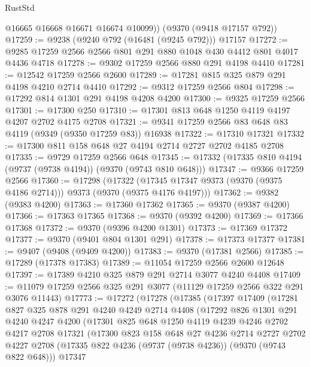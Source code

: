 \begin{lexlean}{RustStd}
\begin{coremodule}
        @16665
        @16668
        @16671
        @16674
        @10099))
    (@9370 (@9418 @17157 @792))
@17259 := @9238 (@9240 @792 (@16481 (@9245 @792))) @17157
@17272 := @9285 @17259 @2566 @2566 @801 @291 @880 @1048 @430 @4412 @801 @4017 @4436 @4718
@17278 := @9302 @17259 @2566 @880 @291 @4198 @4410
@17281 := @12542 @17259 @2566 @2600
@17289 := @17281 @815 @325 @879 @291 @4198 @4210 @2714 @4410
@17292 := @9312 @17259 @2566 @804
@17298 := @17292 @814 @1301 @291 @4198 @4208 @4200
@17300 := @9325 @17259 @2566
@17301 := @17300 @250
@17310 := @17301 @813 @648 @1250 @4119 @4197 @4207 @2702 @4175 @2708
@17321 := @9341 @17259 @2566 @83 @648 @83 @4119 (@9349 (@9350 @17259 @83)) @16938
@17322 := @17310 @17321
@17332 := @17300 @811 @158 @648 @27 @4194 @2714 @2727 @2702 @4185 @2708
@17335 := @9729 @17259 @2566 @648
@17345 := @17332 (@17335 @810 @4194 (@9737 (@9738 @4194)) (@9370 (@9743 @810 @648)))
@17347 := @9366 @17259 @2566
@17360 := @17298
    (@17322 (@17345 @17347 @9373 (@9370 (@9375 @4186 @2714))) @9373 (@9370 (@9375 @4176 @4197)))
@17362 := @9382 (@9383 @4200)
@17363 := @17360 @17362
@17365 := @9370 (@9387 @4200)
@17366 := @17363 @17365
@17368 := @9370 (@9392 @4200)
@17369 := @17366 @17368
@17372 := @9370 (@9396 @4200 @1301)
@17373 := @17369 @17372
@17377 := @9370 (@9401 @804 @1301 @291)
@17378 := @17373 @17377
@17381 := @9407 (@9408 (@9409 @4200))
@17383 := @9370 (@17381 @2566)
@17385 := @17289 (@17378 @17383)
@17389 := @11054 @17259 @2566 @2600 @12648
@17397 := @17389 @4210 @325 @879 @291 @2714 @3077 @4240 @4408
@17409 := @11079 @17259 @2566 @325 @291 @3077 (@11129 @17259 @2566 @322 @291 @3076 @11443)
@17773 := @17272
    (@17278
      (@17385
        (@17397
          @17409
          (@17281
            @827
            @325
            @878
            @291
            @4240
            @4249
            @2714
            @4408
            (@17292
              @826
              @1301
              @291
              @4240
              @4247
              @4200
              (@17301
                @825
                @648
                @1250
                @4119
                @4239
                @4246
                @2702
                @4217
                @2708
                @17321
                (@17300
                  @823
                  @158
                  @648
                  @27
                  @4236
                  @2714
                  @2727
                  @2702
                  @4227
                  @2708
                  (@17335 @822 @4236 (@9737 (@9738 @4236)) (@9370 (@9743 @822 @648)))
                  @17347

\end{coremodule}
\end{lexlean}
